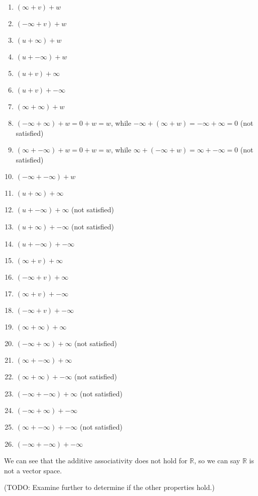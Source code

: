 \documentclass[12pt, letterpaper, oneside]{book}
\begin{document}
\begin{enumerate}
  \item $(\infty + v) + w$
  \item $(-\infty + v) + w$
  \item $(u + \infty) + w$
  \item $(u + -\infty) + w$
  \item $(u + v) + \infty$
  \item $(u + v) + -\infty$
  \item $(\infty + \infty) + w$
  \item $(-\infty + \infty) + w = 0 + w = w$, while $-\infty + (\infty + w) =
    -\infty + \infty = 0$ (not satisfied)
  \item $(\infty + -\infty) + w = 0 + w = w$, while $\infty + (-\infty + w) =
    \infty + -\infty = 0$ (not satisfied)
  \item $(-\infty + -\infty) + w$
  \item $(u + \infty) + \infty$
  \item $(u + -\infty) + \infty$ (not satisfied)
  \item $(u + \infty) + -\infty$ (not satisfied)
  \item $(u + -\infty) + -\infty$
  \item $(\infty + v) + \infty$
  \item $(-\infty + v) + \infty$
  \item $(\infty + v) + -\infty$
  \item $(-\infty + v) + -\infty$
  \item $(\infty + \infty) + \infty$
  \item $(-\infty + \infty) + \infty$ (not satisfied)
  \item $(\infty + -\infty) + \infty$
  \item $(\infty + \infty) + -\infty$ (not satisfied)
  \item $(-\infty + -\infty) + \infty$ (not satisfied)
  \item $(-\infty + \infty) + -\infty$
  \item $(\infty + -\infty) + -\infty$ (not satisfied)
  \item $(-\infty + -\infty) + -\infty$
\end{enumerate}

We can see that the additive associativity does not hold for $\mathbb{R}$, so
we can say $\mathbb{R}$ is not a vector space.

(TODO: Examine further to determine if the other properties hold.)
\end{document}
